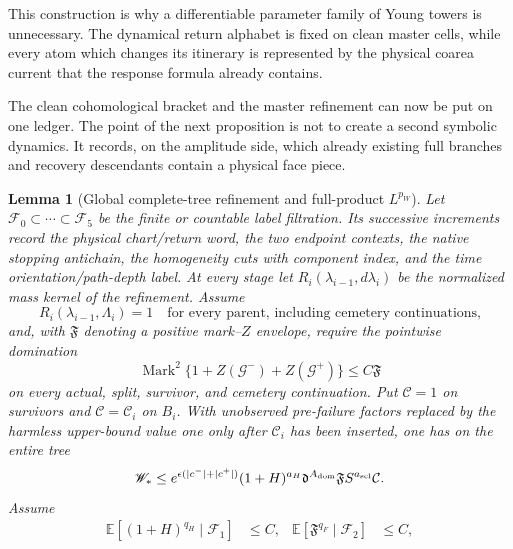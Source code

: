 \documentclass[11pt]{article}
\newtheorem{lemma}[theorem]{Lemma}
\begin{document}
This construction is why a differentiable parameter family of Young towers
is unnecessary.  The dynamical return alphabet is fixed on clean master
cells, while every atom which changes its itinerary is represented by the
physical coarea current that the response formula already contains.

The clean cohomological bracket and the master refinement can now be put on one ledger.  The
point of the next proposition is not to create a second symbolic dynamics.
It records, on the amplitude side, which already existing full branches and
recovery descendants contain a physical face piece.

\begin{lemma}[Global complete-tree refinement and full-product $L^{p_W}$]
\label{lem:measurable-refinement-moments}
Let $\mathcal F_0\subset\cdots\subset\mathcal F_5$ be the finite or countable
label filtration.  Its successive increments record the physical
chart/return word, the two endpoint contexts, the native stopping antichain,
the homogeneity cuts with component index, and the time
orientation/path-depth label.  At every stage let
$R_i(\lambda_{i-1},d\lambda_i)$ be the normalized
mass kernel of the refinement.  Assume
\begin{equation}
\label{eq:refinement-kernel-mass}
 R_i(\lambda_{i-1},\Lambda_i)=1
 \quad\text{for every parent, including cemetery continuations,}
\end{equation}
and, with $\mathfrak F$ denoting a positive mark--$Z$ envelope, require the
pointwise domination
\begin{equation}
\label{eq:full-mark-cemetery-domination}
 \operatorname{Mark}^2
 \{1+Z(\mathcal G^-)+Z(\mathcal G^+)\}\le C\mathfrak F
\end{equation}
on every actual, split, survivor, and cemetery continuation.  Put
$\mathcal C=1$ on survivors and $\mathcal C=\mathcal C_i$ on $B_i$.
With unobserved pre-failure factors replaced by the harmless upper-bound
value one only after $\mathcal C_i$ has been inserted, one has on the entire
tree
\begin{equation}
\label{eq:full-cemetery-product-envelope}
 \mathscr W_*\le
 e^{\epsilon(|c^-|+|c^+|)}(1+H)^{a_H}
 \mathfrak d^{A_{\rm dom}}\mathfrak F
 S^{a_{\rm scl}}\mathcal C.
\end{equation}
Assume
\begin{align}
 \mathbb E[(1+H)^{q_H}\mid\mathcal F_1]&\le C,&
 \mathbb E[\mathfrak F^{q_F}\mid\mathcal F_2]&\le C,
 \label{eq:conditional-refinement-moments}\\

\end{align}
\end{lemma}
\end{document}
